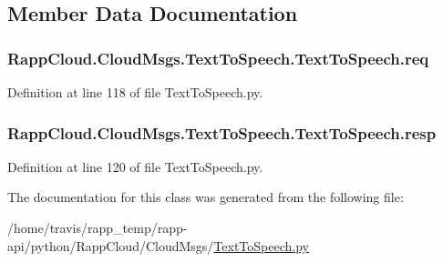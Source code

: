 \subsection{Member Data Documentation}
\hypertarget{classRappCloud_1_1CloudMsgs_1_1TextToSpeech_1_1TextToSpeech_a5bd3eec49c4346c618a92f1e39bc36c5}{
\subsubsection[{req}]{\setlength{\rightskip}{0pt plus 5cm}Rapp\-Cloud.\-Cloud\-Msgs.\-Text\-To\-Speech.\-Text\-To\-Speech.\-req}}\label{classRappCloud_1_1CloudMsgs_1_1TextToSpeech_1_1TextToSpeech_a5bd3eec49c4346c618a92f1e39bc36c5}


Definition at line 118 of file Text\-To\-Speech.\-py.

\hypertarget{classRappCloud_1_1CloudMsgs_1_1TextToSpeech_1_1TextToSpeech_ae99f79e1f8120b4827094110b28186e0}{
\subsubsection[{resp}]{\setlength{\rightskip}{0pt plus 5cm}Rapp\-Cloud.\-Cloud\-Msgs.\-Text\-To\-Speech.\-Text\-To\-Speech.\-resp}}\label{classRappCloud_1_1CloudMsgs_1_1TextToSpeech_1_1TextToSpeech_ae99f79e1f8120b4827094110b28186e0}


Definition at line 120 of file Text\-To\-Speech.\-py.



The documentation for this class was generated from the following file\-:\begin{DoxyCompactItemize}
\item 
/home/travis/rapp\-\_\-temp/rapp-\/api/python/\-Rapp\-Cloud/\-Cloud\-Msgs/\hyperlink{TextToSpeech_8py}{Text\-To\-Speech.\-py}\end{DoxyCompactItemize}
